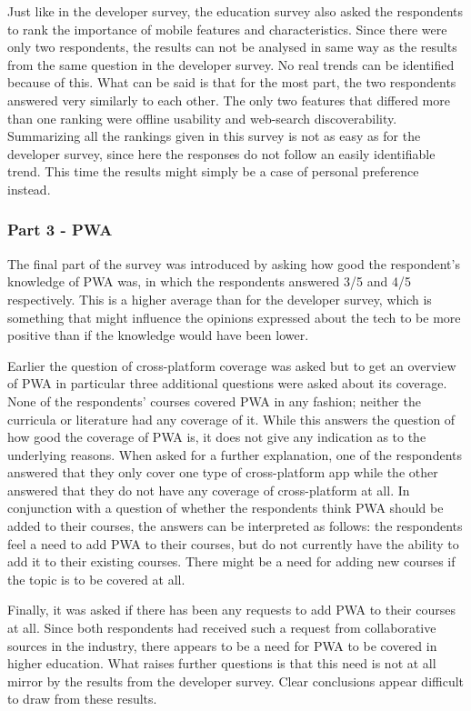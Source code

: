 \documentclass[a4paper,12pt]{article}
\begin{document}
Just like in the developer survey, the education survey also asked the respondents to rank the importance of mobile features and characteristics. Since there were only two respondents, the results can not be analysed in same way as the results from the same question in the developer survey. No real trends can be identified because of this. What can be said is that for the most part, the two respondents answered very similarly to each other. The only two features that differed more than one ranking were offline usability and web-search discoverability. Summarizing all the rankings given in this survey is not as easy as for the developer survey, since here the responses do not follow an easily identifiable trend. This time the results might simply be a case of personal preference instead.

\subsubsection{Part 3 - PWA}
\label{Analysis_eduSurvey_part3}
The final part of the survey was introduced by asking how good the respondent's knowledge of PWA was, in which the respondents answered 3/5 and 4/5 respectively. This is a higher average than for the developer survey, which is something that might influence the opinions expressed about the tech to be more positive than if the knowledge would have been lower.

Earlier the question of cross-platform coverage was asked but to get an overview of PWA in particular three additional questions were asked about its coverage. None of the respondents' courses covered PWA in any fashion; neither the curricula or literature had any coverage of it. While this answers the question of how good the coverage of PWA is, it does not give any indication as to the underlying reasons. When asked for a further explanation, one of the respondents answered that they only cover one type of cross-platform app while the other answered that they do not have any coverage of cross-platform at all. In conjunction with a question of whether the respondents think PWA should be added to their courses, the answers can be interpreted as follows: the respondents feel a need to add PWA to their courses, but do not currently have the ability to add it to their existing courses. There might be a need for adding new courses if the topic is to be covered at all.

Finally, it was asked if there has been any requests to add PWA to their courses at all. Since both respondents had received such a request from collaborative sources in the industry, there appears to be a need for PWA to be covered in higher education. What raises further questions is that this need is not at all mirror by the results from the developer survey. Clear conclusions appear difficult to draw from these results.
\end{document}
